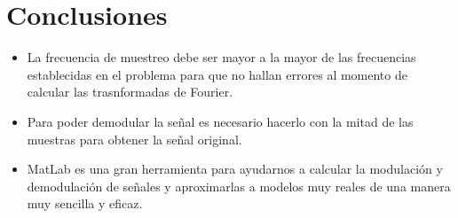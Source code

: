 \documentclass[onecolumn]{IEEEtran}
\begin{document}
\section{Conclusiones}
\begin{itemize}
 \item La frecuencia de muestreo debe ser mayor a la mayor de las frecuencias establecidas en el problema para que no hallan errores al momento de calcular las trasnformadas de Fourier.
 \item Para poder demodular la señal es necesario hacerlo con la mitad de las muestras para obtener la señal original.
 \item MatLab es una gran herramienta para ayudarnos a calcular la modulación y demodulación de señales y aproximarlas a modelos muy reales de una manera muy sencilla y eficaz.
\end{itemize}
\end{document}
